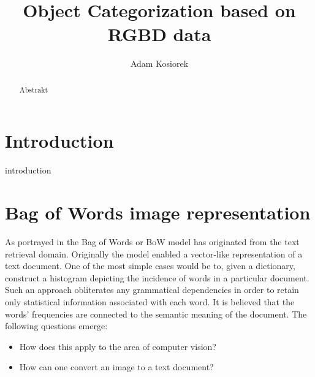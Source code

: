 \documentclass[a4paper,12pt]{article}
\title{Object Categorization based on RGBD data}
\author{Adam Kosiorek}
\begin{document}
\maketitle

\begin{abstract}

Abstrakt

\end{abstract}

%

\section{Introduction}

introduction

\section{Bag of Words image representation}

  As portrayed in \cite{tsai2012bag} the Bag of Words or BoW model has originated from the text retrieval domain. Originally the model enabled a vector-like representation of a text document. One of the most simple cases would be to, given a dictionary, construct a histogram depicting the incidence of words in a particular document. Such an approach obliterates any grammatical dependencies in order to retain only statistical information associated with each word. It is believed that the words' frequencies are connected to the semantic meaning of the document. The following questions emerge: 
  
  \begin{itemize}
    \item How does this apply to the area of computer vision?
    \item How can one convert an image to a text document? 
  \end{itemize}
  
\end{document}
